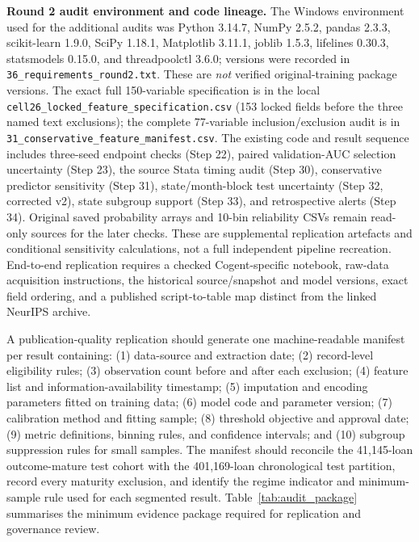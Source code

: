 \documentclass[10pt]{article}
\begin{document}
\noindent\textbf{Round 2 audit environment and code lineage.} The Windows environment used for the additional audits was Python 3.14.7, NumPy 2.5.2, pandas 2.3.3, scikit-learn 1.9.0, SciPy 1.18.1, Matplotlib 3.11.1, joblib 1.5.3, lifelines 0.30.3, statsmodels 0.15.0, and threadpoolctl 3.6.0; versions were recorded in \texttt{36\_requirements\_round2.txt}. These are \emph{not} verified original-training package versions. The exact full 150-variable specification is in the local \texttt{cell26\_locked\_feature\_specification.csv} (153 locked fields before the three named text exclusions); the complete 77-variable inclusion/exclusion audit is in \texttt{31\_conservative\_feature\_manifest.csv}. The existing code and result sequence includes three-seed endpoint checks (Step 22), paired validation-AUC selection uncertainty (Step 23), the source Stata timing audit (Step 30), conservative predictor sensitivity (Step 31), state/month-block test uncertainty (Step 32, corrected v2), state subgroup support (Step 33), and retrospective alerts (Step 34). Original saved probability arrays and 10-bin reliability CSVs remain read-only sources for the later checks. These are supplemental replication artefacts and conditional sensitivity calculations, not a full independent pipeline recreation. End-to-end replication requires a checked Cogent-specific notebook, raw-data acquisition instructions, the historical source/snapshot and model versions, exact field ordering, and a published script-to-table map distinct from the linked NeurIPS archive.


A publication-quality replication should generate one machine-readable manifest per result containing: (1) data-source and extraction date; (2) record-level eligibility rules; (3) observation count before and after each exclusion; (4) feature list and information-availability timestamp; (5) imputation and encoding parameters fitted on training data; (6) model code and parameter version; (7) calibration method and fitting sample; (8) threshold objective and approval date; (9) metric definitions, binning rules, and confidence intervals; and (10) subgroup suppression rules for small samples. The manifest should reconcile the 41,145-loan outcome-mature test cohort with the 401,169-loan chronological test partition, record every maturity exclusion, and identify the regime indicator and minimum-sample rule used for each segmented result. Table~\ref{tab:audit_package} summarises the minimum evidence package required for replication and governance review.
\end{document}

